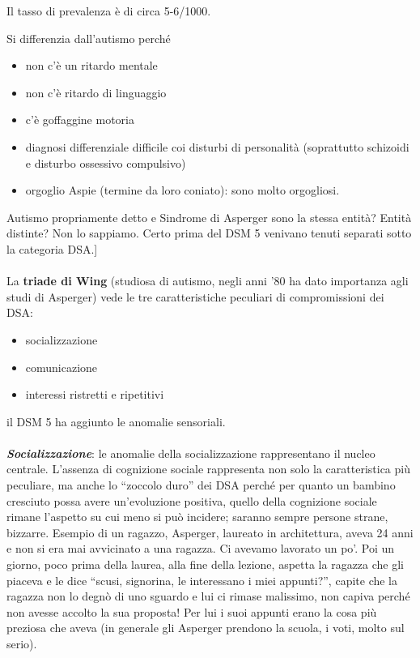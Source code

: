 Il tasso di prevalenza è di circa 5-6/1000.

Si differenzia dall'autismo perché

\begin{itemize}
\item
  non c'è un ritardo mentale
\item
  non c'è ritardo di linguaggio
\item
  c'è goffaggine motoria
\item
  diagnosi differenziale difficile coi disturbi di personalità
  (soprattutto schizoidi e disturbo ossessivo compulsivo)
\item
  orgoglio Aspie (termine da loro coniato): sono molto orgogliosi.
\end{itemize}

Autismo propriamente detto e Sindrome di Asperger sono la stessa entità?
Entità distinte? Non lo sappiamo. Certo prima del DSM 5 venivano tenuti
separati sotto la categoria DSA.{]}
\\\\
La \textbf{triade di Wing} (studiosa di autismo, negli anni '80 ha dato
importanza agli studi di Asperger) vede le tre caratteristiche peculiari
di compromissioni dei DSA:

\begin{itemize}
\item
  socializzazione
\item
  comunicazione
\item
  interessi ristretti e ripetitivi
\end{itemize}

il DSM 5 ha aggiunto le anomalie sensoriali.
\\\\
\emph{\textbf{Socializzazione}}: le anomalie della socializzazione
rappresentano il nucleo centrale. L'assenza di cognizione sociale
rappresenta non solo la caratteristica più peculiare, ma anche lo
``zoccolo duro'' dei DSA perché per quanto un bambino cresciuto possa
avere un'evoluzione positiva, quello della cognizione sociale rimane
l'aspetto su cui meno si può incidere; saranno sempre persone strane,
bizzarre. Esempio di un ragazzo, Asperger, laureato in architettura,
aveva 24 anni e non si era mai avvicinato a una ragazza. Ci avevamo
lavorato un po'. Poi un giorno, poco prima della laurea, alla fine della
lezione, aspetta la ragazza che gli piaceva e le dice ``scusi,
signorina, le interessano i miei appunti?'', capite che la ragazza non
lo degnò di uno sguardo e lui ci rimase malissimo, non capiva perché non
avesse accolto la sua proposta! Per lui i suoi appunti erano la cosa più
preziosa che aveva (in generale gli Asperger prendono la scuola, i voti,
molto sul serio).


